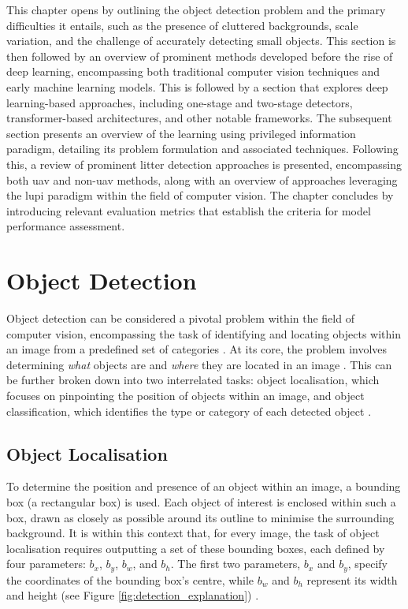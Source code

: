 This chapter opens by outlining the object detection problem and the primary difficulties it entails, such as the presence of cluttered backgrounds, scale variation, and the challenge of accurately detecting small objects. This section is then followed by an overview of prominent methods developed before the rise of deep learning, encompassing both traditional computer vision techniques and early machine learning models. This is followed by a section that explores deep learning-based approaches, including one-stage and two-stage detectors, transformer-based architectures, and other notable frameworks. The subsequent section presents an overview of the learning using privileged information paradigm, detailing its problem formulation and associated techniques. Following this, a review of prominent litter detection approaches is presented, encompassing both \gls{uav} and non-\gls{uav} methods, along with an overview of approaches leveraging the \gls{lupi} paradigm within the field of computer vision. The chapter concludes by introducing relevant evaluation metrics that establish the criteria for model performance assessment.

\section{Object Detection}
\label{sec:2_detection}

Object detection can be considered a pivotal problem within the field of computer vision, encompassing the task of identifying and locating objects within an image from a predefined set of categories \cite{od_1}. At its core, the problem involves determining \textit{what} objects are and \textit{where} they are located in an image \cite{four_pillars_od}. This can be further broken down into two interrelated tasks: object localisation, which focuses on pinpointing the position of objects within an image, and object classification, which identifies the type or category of each detected object \cite{od_1, od_2, od_3}.

\subsection{Object Localisation}
\label{subsec:2_localisation}
To determine the position and presence of an object within an image, a bounding box (a rectangular box) is used. Each object of interest is enclosed within such a box, drawn as closely as possible around its outline to minimise the surrounding background. It is within this context that, for every image, the task of object localisation requires outputting a set of these bounding boxes, each defined by four parameters: \(b_x\), \(b_y\), \(b_w\), and \(b_h\). The first two parameters, \(b_x\) and \(b_y\), specify the coordinates of the bounding box's centre, while \(b_w\) and \(b_h\) represent its width and height (see Figure \ref{fig:detection_explanation}) \cite{od_2}.

